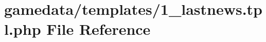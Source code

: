 \hypertarget{1__lastnews_8tpl_8php}{\section{gamedata/templates/1\+\_\+lastnews.tpl.\+php File Reference}
\label{1__lastnews_8tpl_8php}
}
